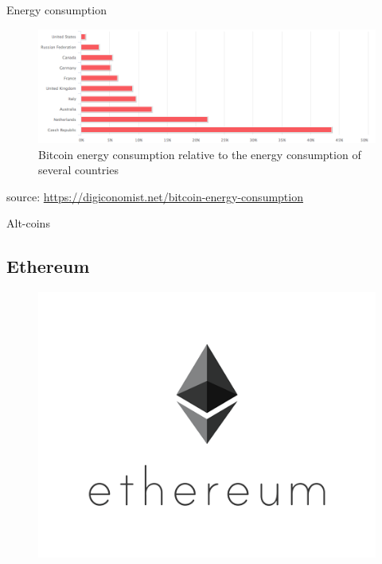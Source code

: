 \documentclass[11pt]{beamer}
\begin{document}
\begin{frame}{Energy consumption}
	\begin{figure}[]
		\centering
		\includegraphics  [scale=0.3]{Images/bitcoin-energy}
		\caption{Bitcoin energy consumption relative to the energy consumption of several countries}
	\end{figure}
	\begin{scriptsize}
		source: \href{https://digiconomist.net/bitcoin-energy-consumption}{https://digiconomist.net/bitcoin-energy-consumption}
	\end{scriptsize}
\end{frame}



\begin{frame}
\begin{center}
\begin{large}
Alt-coins
\end{large}
\end{center}
\end{frame}

\subsection{Ethereum}

\begin{frame}
	\begin{figure}[]
		\centering
		\includegraphics  [scale=0.3]{Images/ethereum-logo}
	\end{figure}
\end{frame}
\end{document}
